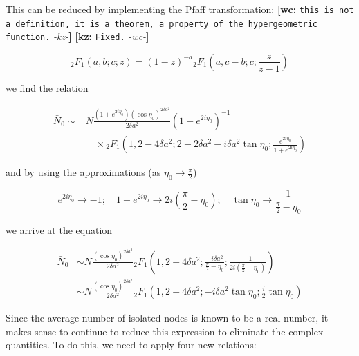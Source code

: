 \documentclass[preprint,notitlepage,amsmath,amssymb,floatfix]{revtex4-1}
\newcommand{\XXX}[3]{{\bf [#1: } {\tt #3} {\it -#2-}{\bf ]}}
\begin{document}
\noindent This can be reduced by implementing the Pfaff transformation: \XXX{wc}{kz}{this is not a definition, it is a theorem, a property of the hypergeometric function.} \XXX{kz}{wc}{Fixed.}

\begin{equation}
{}_2F_1\left(a,b;c;z\right) = \left(1-z\right)^{-a} {}_2F_1\left(a,c-b;c;\frac{z}{z-1}\right)
\end{equation}

\noindent we find the relation

\begin{equation}
\begin{split}
\bar{N}_0 \sim &N\frac{\left(1+e^{2i\eta_0}\right)\left(\cos\eta_0\right)^{2\delta a^2}}{2\delta a^2}\left(1+e^{2i\eta_0}\right)^{-1} \\
&\quad \times {}_2F_1\left(1,2-4\delta a^2;2-2\delta a^2-i\delta a^2\tan\eta_0;\frac{e^{2i\eta_0}}{1+e^{2i\eta_0}}\right)
\end{split}
\end{equation}

\noindent and by using the approximations (as $\eta_0\to\frac{\pi}{2}$)

\begin{equation}
e^{2i\eta_0}\to -1;\quad 1+e^{2i\eta_0}\to 2i\left(\frac{\pi}{2} - \eta_0\right);\quad \tan\eta_0\to\frac{1}{\frac{\pi}{2}-\eta_0}
\end{equation}

we arrive at the equation

\begin{equation}
\begin{split}
\bar{N}_0 &\sim N\frac{\left(\cos\eta_0\right)^{2\delta a^2}}{2\delta a^2} {}_2F_1\left(1,2-4\delta a^2;\frac{-i\delta a^2}{\frac{\pi}{2}-\eta_0};\frac{-1}{2i\left(\frac{\pi}{2}-\eta_0\right)}\right) \\
&\sim N\frac{\left(\cos\eta_0\right)^{2\delta a^2}}{2\delta a^2} {}_2F_1\left(1,2-4\delta a^2;-i\delta a^2\tan\eta_0;\frac{i}{2}\tan\eta_0\right)
\end{split}
\end{equation}

Since the average number of isolated nodes is known to be a real number, it makes sense to continue to reduce this expression to eliminate the complex quantities.  
To do this, we need to apply four new relations:
\end{document}
